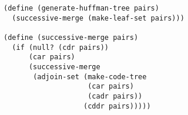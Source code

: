 \documentclass[a4paper,12pt]{article}
\begin{document}
\begin{lstlisting}
(define (generate-huffman-tree pairs)
  (successive-merge (make-leaf-set pairs)))

(define (successive-merge pairs)
  (if (null? (cdr pairs))
      (car pairs)
      (successive-merge
       (adjoin-set (make-code-tree
                    (car pairs)
                    (cadr pairs))
                   (cddr pairs)))))
\end{lstlisting}
\end{document}
